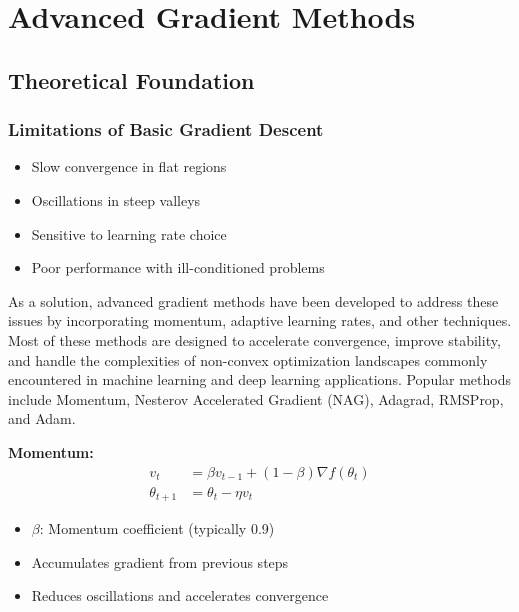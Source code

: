 \documentclass[
  letterpaper,
  DIV=11,
  numbers=noendperiod]{scrreprt}
\providecommand{\tightlist}{%
  \setlength{\itemsep}{0pt}\setlength{\parskip}{0pt}}
\begin{document}
\section{Advanced Gradient Methods}\label{advanced-gradient-methods}

\subsection{Theoretical Foundation}\label{theoretical-foundation-11}

\subsubsection{Limitations of Basic Gradient
Descent}\label{limitations-of-basic-gradient-descent}

\begin{itemize}
\tightlist
\item
  Slow convergence in flat regions
\item
  Oscillations in steep valleys
\item
  Sensitive to learning rate choice
\item
  Poor performance with ill-conditioned problems
\end{itemize}

As a solution, advanced gradient methods have been developed to address
these issues by incorporating momentum, adaptive learning rates, and
other techniques. Most of these methods are designed to accelerate
convergence, improve stability, and handle the complexities of
non-convex optimization landscapes commonly encountered in machine
learning and deep learning applications. Popular methods include
Momentum, Nesterov Accelerated Gradient (NAG), Adagrad, RMSProp, and
Adam.

\textbf{Momentum:} \[
\begin{aligned}
v_t &= \beta v_{t-1} + (1 - \beta) \nabla f(\theta_t) \\
\theta_{t+1} &= \theta_t - \eta v_t
\end{aligned}
\]

\begin{itemize}
\tightlist
\item
  \(\beta\): Momentum coefficient (typically 0.9)
\item
  Accumulates gradient from previous steps
\item
  Reduces oscillations and accelerates convergence
\end{itemize}
\end{document}
